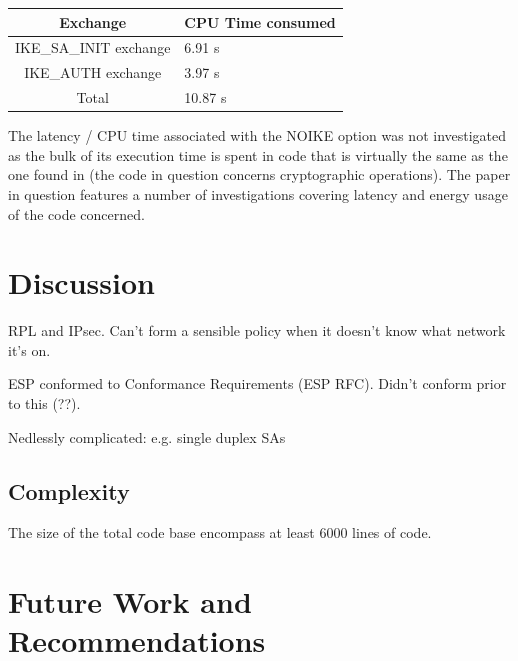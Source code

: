 \documentclass[final,a4paper,twoside,11pt,onecolumn]{report}
\begin{document}
\begin{tabular}{c|l}                        
Exchange                   & CPU Time consumed    \\ \hline
IKE\_SA\_INIT exchange       & 6.91 s               \\
IKE\_AUTH exchange          & 3.97 s               \\
Total                      & 10.87 s            
\end{tabular}                                   

The latency / CPU time associated with the NOIKE option was not investigated as the bulk of its execution time is spent in code  that is virtually the same as the one found in \cite{raza2011securing} (the code in question concerns cryptographic operations). The paper in question features a number of investigations covering latency and energy usage of the code concerned.



\chapter{Discussion}
RPL and IPsec. Can't form a sensible policy when it doesn't know what network it's on.

ESP conformed to Conformance Requirements (ESP RFC). Didn't conform prior to this (??).

Nedlessly complicated: e.g. single duplex SAs

\section{Complexity}
The size of the total code base encompass at least 6000 lines of code.



\chapter{Future Work and Recommendations}

\label{cha:fw}




\end{document}
